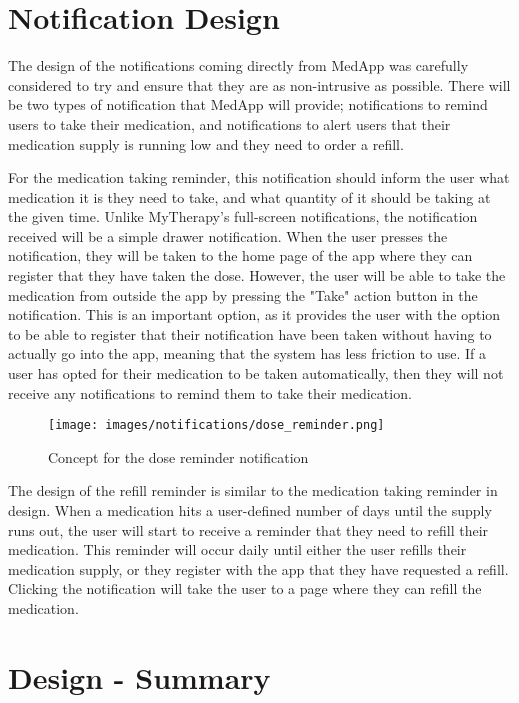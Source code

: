 \documentclass{l4proj}
\begin{document}
\section{Notification Design}

The design of the notifications coming directly from MedApp was carefully considered to try and ensure that they are as non-intrusive as possible. There will be two types of notification that MedApp will provide; notifications to remind users to take their medication, and notifications to alert users that their medication supply is running low and they need to order a refill.

For the medication taking reminder, this notification should inform the user what medication it is they need to take, and what quantity of it should be taking at the given time. Unlike MyTherapy's full-screen notifications, the notification received will be a simple drawer notification. When the user presses the notification, they will be taken to the home page of the app where they can register that they have taken the dose. However, the user will be able to take the medication from outside the app by pressing the "Take" action button in the notification. This is an important option, as it provides the user with the option to be able to register that their notification have been taken without having to actually go into the app, meaning that the system has less friction to use. If a user has opted for their medication to be taken automatically, then they will not receive any notifications to remind them to take their medication.


\begin{figure}[!ht]
    \centering
    \texttt{[image: images/notifications/dose\_reminder.png]}
    \caption{Concept for the dose reminder notification}
    \label{fig:dose_notification}
\end{figure}
\newpage
The design of the refill reminder is similar to the medication taking reminder in design. When a medication hits a user-defined number of days until the supply runs out, the user will start to receive a reminder that they need to refill their medication. This reminder will occur daily until either the user refills their medication supply, or they register with the app that they have requested a refill. Clicking the notification will take the user to a page where they can refill the medication. 

\section{Design - Summary}
\end{document}
